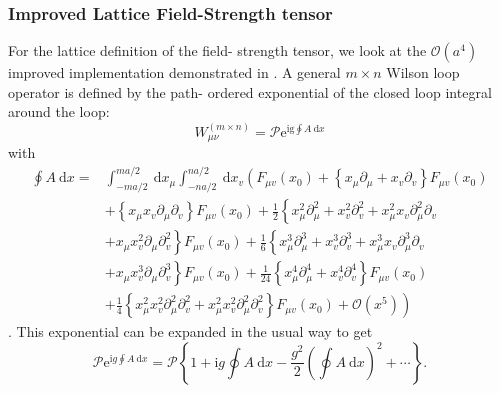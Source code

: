 \documentclass[a4paper,10pt]{article}
\begin{document}
\subsubsection{Improved Lattice Field-Strength tensor}\label{sec:improvedLatticeFieldStrengthTensor}
For the lattice definition of the field- strength tensor, we look at the $\mathcal{O}\left(a^{4}\right)$ improved implementation demonstrated in \cite{BILSONTHOMPSON20031}. A general $m\times n$ Wilson loop operator is defined by the path- ordered exponential of the closed loop integral around the loop:
\begin{equation}
W_{\mu \nu}^{(m \times n)}=\mathscr{P} \mathrm{e}^{\mathrm{ig} \oint A \mathrm{~d} x}
\end{equation}
with 
\begin{equation}\label{eq:WilsonLoopExpansionLoopIntegral}
\begin{aligned}
\oint A \mathrm{~d} x=& \int_{-m a / 2}^{m a / 2} \mathrm{~d} x_{\mu} \int_{-n a / 2}^{n a / 2} \mathrm{~d} x_{v}\left(F_{\mu v}\left(x_{0}\right)+\left\{x_{\mu} \partial_{\mu}+x_{v} \partial_{v}\right\} F_{\mu v}\left(x_{0}\right)\right.\\
&+\left\{x_{\mu} x_{v} \partial_{\mu} \partial_{v}\right\} F_{\mu v}\left(x_{0}\right)+\frac{1}{2}\left\{x_{\mu}^{2} \partial_{\mu}^{2}+x_{v}^{2} \partial_{v}^{2}+x_{\mu}^{2} x_{v} \partial_{\mu}^{2} \partial_{v}\right.\\
&\left.+x_{\mu} x_{v}^{2} \partial_{\mu} \partial_{v}^{2}\right\} F_{\mu v}\left(x_{0}\right)+\frac{1}{6}\left\{x_{\mu}^{3} \partial_{\mu}^{3}+x_{v}^{3} \partial_{v}^{3}+x_{\mu}^{3} x_{v} \partial_{\mu}^{3} \partial_{v}\right.\\
&\left.+x_{\mu} x_{v}^{3} \partial_{\mu} \partial_{v}^{3}\right\} F_{\mu v}\left(x_{0}\right)+\frac{1}{24}\left\{x_{\mu}^{4} \partial_{\mu}^{4}+x_{v}^{4} \partial_{v}^{4}\right\} F_{\mu v}\left(x_{0}\right) \\
&\left.+\frac{1}{4}\left\{x_{\mu}^{2} x_{v}^{2} \partial_{\mu}^{2} \partial_{v}^{2}+x_{\mu}^{2} x_{v}^{2} \partial_{\mu}^{2} \partial_{v}^{2}\right\} F_{\mu v}\left(x_{0}\right)+\mathcal{O}\left(x^{5}\right)\right) 
\end{aligned}
\end{equation}
\cite{BILSONTHOMPSON20031}. This exponential can be expanded in the usual way to get 
\begin{equation}
\mathscr{P} \mathrm{e}^{\mathrm{i} g \oint A \mathrm{~d} x}=\mathscr{P}\left\{1+\mathrm{i} g \oint A \mathrm{~d} x-\frac{g^{2}}{2}(\oint A \mathrm{~d} x)^{2}+\cdots\right\}.
\end{equation}
\end{document}
